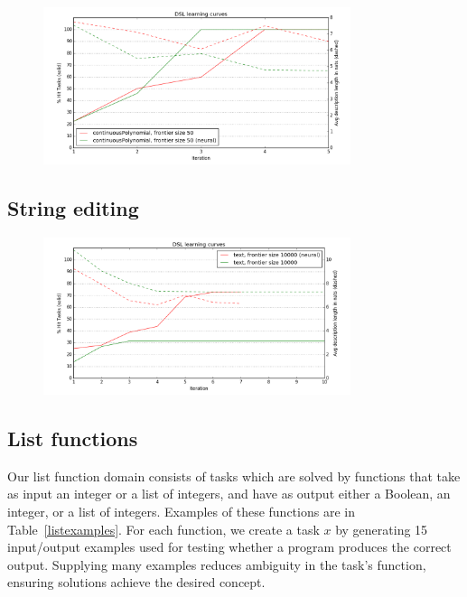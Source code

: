 \documentclass{article}
\begin{document}
\begin{figure}
      \includegraphics[width = 9cm]{figures/polynomial.png}
\end{figure}
\subsection{String editing}\label{textSection}
\begin{figure}

  \includegraphics[width = 9cm]{figures/text.png}

\end{figure}

\subsection{List functions}
Our list function domain consists of tasks which are solved by functions
that take as input an integer or a list of integers, and have as output
either a Boolean, an integer, or a list of integers. Examples of these
functions are in Table~\ref{listexamples}. For each function, we create a
task $x$ by generating 15 input/output examples used for testing whether a
program produces the correct output. Supplying many examples reduces
ambiguity in the task's function, ensuring solutions achieve the desired
concept.
\end{document}
